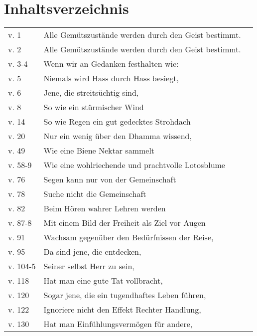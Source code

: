 \chapter{Inhaltsverzeichnis}

{\smaller
\setlength{\parskip}{0pt}
\setlength{\parindent}{0pt}

\begin{longtable}[c]{llr}
v. 1 & Alle Gemütszustände werden durch den Geist bestimmt. & \pageref{dhp-1}\\
v. 2 & Alle Gemütszustände werden durch den Geist bestimmt. & \pageref{dhp-2}\\
v. 3-4 & Wenn wir an Gedanken festhalten wie: & \pageref{dhp-3}\\
v. 5 & Niemals wird Hass durch Hass besiegt, & \pageref{dhp-5}\\
v. 6 & Jene, die streitsüchtig sind, & \pageref{dhp-6}\\
v. 8 & So wie ein stürmischer Wind & \pageref{dhp-8}\\
v. 14 & So wie Regen ein gut gedecktes Strohdach & \pageref{dhp-14}\\
v. 20 & Nur ein wenig über den Dhamma wissend, & \pageref{dhp-20}\\
v. 49 & Wie eine Biene Nektar sammelt & \pageref{dhp-49}\\
v. 58-9 & Wie eine wohlriechende und prachtvolle Lotosblume & \pageref{dhp-58}\\
v. 76 & Segen kann nur von der Gemeinschaft & \pageref{dhp-76}\\
v. 78 & Suche nicht die Gemeinschaft & \pageref{dhp-78}\\
v. 82 & Beim Hören wahrer Lehren werden & \pageref{dhp-82}\\
v. 87-8 & Mit einem Bild der Freiheit als Ziel vor Augen & \pageref{dhp-87}\\
v. 91 & Wachsam gegenüber den Bedürfnissen der Reise, & \pageref{dhp-91}\\
v. 95 & Da sind jene, die entdecken, & \pageref{dhp-95}\\
v. 104-5 & Seiner selbst Herr zu sein, & \pageref{dhp-104}\\
v. 118 & Hat man eine gute Tat vollbracht, & \pageref{dhp-118}\\
v. 120 & Sogar jene, die ein tugendhaftes Leben führen, & \pageref{dhp-120}\\
v. 122 & Ignoriere nicht den Effekt Rechter Handlung, & \pageref{dhp-122}\\
v. 130 & Hat man Einfühlungsvermögen für andere, & \pageref{dhp-130}\\

\end{longtable}}
